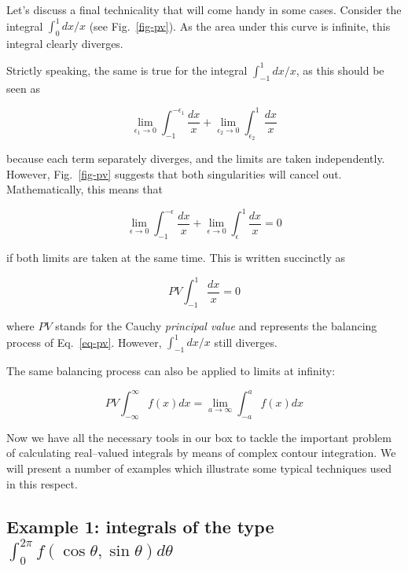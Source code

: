 Let's discuss a final technicality that will come handy in some cases. Consider the integral $\int_0^1 dx / x$ (see Fig.~\ref{fig-pv}). As the area under this curve is infinite, this integral clearly diverges.

Strictly speaking, the same is true for the integral $\int_{-1}^1 dx / x$, as this should be seen as

\begin{equation}
\lim_{\epsilon_1 \to 0} \int_{-1}^{-\epsilon_1} \frac{dx}{x} + \lim_{\epsilon_2
\to 0} \int_{\epsilon_2}^1 \frac{dx}{x}
\end{equation}  

because each term separately diverges, and the limits are taken independently. However, Fig.~\ref{fig-pv} suggests that both singularities will cancel out. Mathematically, this means that

\begin{equation}
\lim_{\epsilon \to 0} \int_{-1}^{-\epsilon} \frac{dx}{x} + \lim_{\epsilon \to 0}
\int_{\epsilon}^1 \frac{dx}{x} = 0 \label{eq-pv}
\end{equation}  

if both limits are taken at the same time. This is written succinctly as

\begin{equation}
PV \int_{-1}^1 \frac{dx}{x} = 0
\end{equation} 

where $PV$ stands for the Cauchy \emph{principal value} and represents the balancing process of Eq.~\ref{eq-pv}. However, $\int_{-1}^1 dx / x$ still diverges.

The same balancing process can also be applied to limits at infinity:

\begin{equation}
PV \int_{-\infty}^\infty f(x) dx = \lim_{a \to \infty} \int_{-a}^{a} f(x) dx
\end{equation} 

\pagebreak


Now we have all the necessary tools in our box to tackle the important problem
of calculating real--valued integrals by means of complex contour integration.
We will present a number of examples which illustrate some typical techniques
used in this respect.

\subsection*{Example 1: integrals of the type $\int_0^{2 \pi} f(\cos \theta, \sin \theta) d \theta$}

